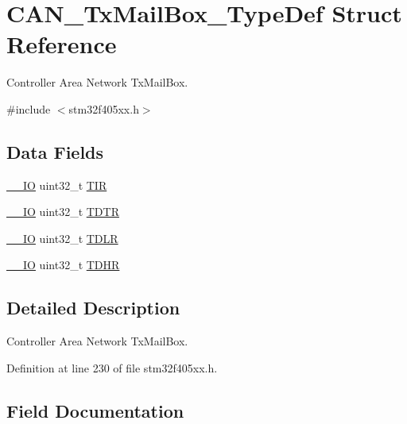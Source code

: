 \hypertarget{struct_c_a_n___tx_mail_box___type_def}{}\section{C\+A\+N\+\_\+\+Tx\+Mail\+Box\+\_\+\+Type\+Def Struct Reference}
\label{struct_c_a_n___tx_mail_box___type_def}


Controller Area Network Tx\+Mail\+Box.  




{\ttfamily \#include $<$stm32f405xx.\+h$>$}

\subsection*{Data Fields}
\begin{DoxyCompactItemize}
\item 
\hyperlink{core__sc300_8h_aec43007d9998a0a0e01faede4133d6be}{\+\_\+\+\_\+\+IO} uint32\+\_\+t \hyperlink{struct_c_a_n___tx_mail_box___type_def_a6921aa1c578a7d17c6e0eb33a73b6630}{T\+IR}
\item 
\hyperlink{core__sc300_8h_aec43007d9998a0a0e01faede4133d6be}{\+\_\+\+\_\+\+IO} uint32\+\_\+t \hyperlink{struct_c_a_n___tx_mail_box___type_def_aed87bed042dd9523ce086119a3bab0ea}{T\+D\+TR}
\item 
\hyperlink{core__sc300_8h_aec43007d9998a0a0e01faede4133d6be}{\+\_\+\+\_\+\+IO} uint32\+\_\+t \hyperlink{struct_c_a_n___tx_mail_box___type_def_aded1359e1a32512910bff534d57ade68}{T\+D\+LR}
\item 
\hyperlink{core__sc300_8h_aec43007d9998a0a0e01faede4133d6be}{\+\_\+\+\_\+\+IO} uint32\+\_\+t \hyperlink{struct_c_a_n___tx_mail_box___type_def_a90f7c1cf22683459c632d6040366eddf}{T\+D\+HR}
\end{DoxyCompactItemize}


\subsection{Detailed Description}
Controller Area Network Tx\+Mail\+Box. 

Definition at line 230 of file stm32f405xx.\+h.



\subsection{Field Documentation}
